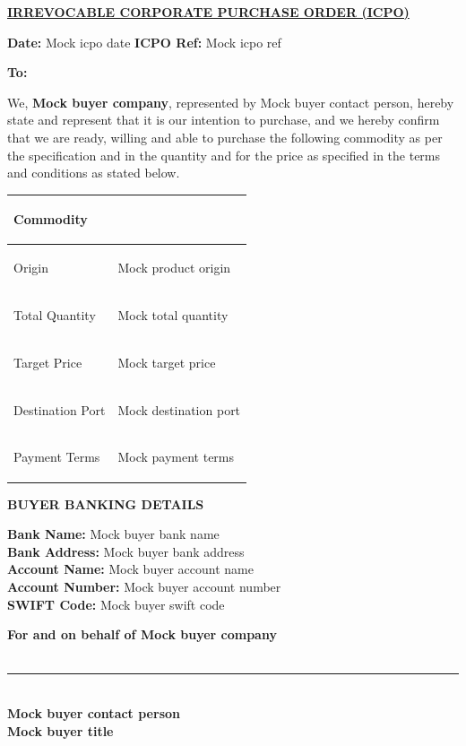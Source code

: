 \documentclass[a4paper,11pt]{article}
\begin{document}
\begin{center}
  {\Large\textbf{\underline{IRREVOCABLE CORPORATE PURCHASE ORDER (ICPO)}}}
\end{center}

\vspace{0.5cm}
\noindent \textbf{Date:} Mock icpo date \hfill \textbf{ICPO Ref:} Mock icpo ref

\vspace{0.5cm}
\noindent \textbf{To: }

\vspace{0.5cm}
\noindent We, \textbf{Mock buyer company}, represented by Mock buyer contact person, hereby state and represent that it is our intention to purchase, and we hereby confirm that we are ready, willing and able to purchase the following commodity as per the specification and in the quantity and for the price as specified in the terms and conditions as stated below.

\vspace{0.5cm}
\begin{center}
\begin{tabularx}{\textwidth}{|>{\bfseries\raggedright\arraybackslash}p{5cm}|>{\raggedright\arraybackslash}X|}
\hline
Commodity &  \\ \hline
Origin & Mock product origin \\ \hline
Total Quantity & Mock total quantity \\ \hline
Target Price & Mock target price \\ \hline
Destination Port & Mock destination port \\ \hline
Payment Terms & Mock payment terms \\ \hline
\end{tabularx}
\end{center}

\vspace{1cm}
\begin{center}{\large\textbf{\color{marooncolor}BUYER BANKING DETAILS}}\end{center}
\vspace{0.3cm}
\noindent
\textbf{Bank Name:} Mock buyer bank name\\
\textbf{Bank Address:} Mock buyer bank address\\
\textbf{Account Name:} Mock buyer account name\\
\textbf{Account Number:} Mock buyer account number\\
\textbf{SWIFT Code:} Mock buyer swift code

\vspace{1.5cm}
\noindent\textbf{For and on behalf of Mock buyer company}\\
\vspace{1.5cm}\\
\rule{6cm}{0.4pt} \\
\textbf{Mock buyer contact person}\\
\textbf{Mock buyer title}
\end{document}
